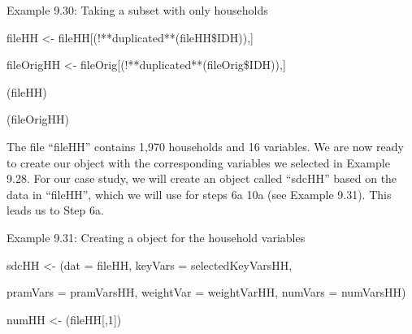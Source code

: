 \documentclass[letterpaper,10pt,english]{sphinxmanual}
\begin{document}
Example 9.30: Taking a subset with only households

\begin{DUlineblock}{0em}
\item[] 
\item[] fileHH \textless{}- fileHH{[}(!**duplicated**(fileHH\$IDH)),{]} 
\item[] fileOrigHH \textless{}-
fileOrig{[}(!**duplicated**(fileOrig\$IDH)),{]} 
\item[] 
\item[] (fileHH)
\end{DUlineblock}


(fileOrigHH)


The file “fileHH” contains 1,970 households and 16 variables. We are now
ready to create our  object with the corresponding variables
we selected in Example 9.28. For our case study, we will create an
 object called “sdcHH” based on the data in “fileHH”, which we
will use for steps 6a \textendash{} 10a (see Example 9.31).  This leads us to
Step 6a.

Example 9.31: Creating a  object for the household variables

\begin{DUlineblock}{0em}
\item[] 
\item[] sdcHH \textless{}- (dat = fileHH, keyVars = selectedKeyVarsHH,
\item[] pramVars = pramVarsHH, weightVar = weightVarHH, numVars = numVarsHH)
\item[] numHH \textless{}- (fileHH{[},1{]}) 
\end{DUlineblock}
\end{document}
